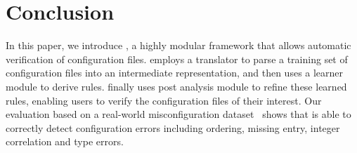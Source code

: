 
\section{Conclusion}

In this paper, we introduce \app, a highly modular framework 
that allows automatic verification of configuration files.
\app employs a translator to parse a training set
of configuration files into an intermediate representation,
and then uses a learner module to derive rules.
\app finally uses post analysis module to refine these learned
rules, enabling users to verify the configuration files of
their interest.
Our evaluation based on a real-world misconfiguration
dataset~\cite{configdataset} shows that \app is able to
correctly detect configuration errors
including ordering, missing entry, integer correlation
and type errors.

